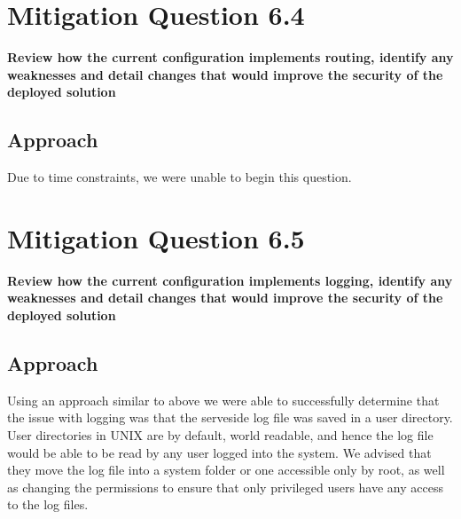 \section{Mitigation Question 6.4}
\textbf{Review how the current configuration implements routing, identify any
weaknesses and detail changes that would improve the security of the deployed
solution}
\subsection{Approach}
Due to time constraints, we were unable to begin this question.

\section{Mitigation Question 6.5}
\textbf{Review how the current configuration implements logging, identify any
weaknesses and detail changes that would improve the security of the deployed
solution}
\subsection{Approach}
Using an approach similar to above we were able to successfully determine that
the issue with logging was that the serveside log file was saved in a user
directory. User directories in UNIX are by default, world readable, and hence
the log file would be able to be read by any user logged into the system. We
advised that they move the log file into a system folder or one accessible only
by root, as well as changing the permissions to ensure that only privileged
users have any access to the log files.
